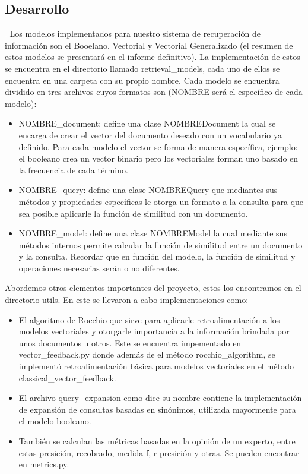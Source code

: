 \documentclass[10pt]{amsart}
\begin{document}
\begin{titlepage}
		\section{Desarrollo} \textcolor{white}{.}
		Los modelos implementados para nuestro sistema de recuperación de información son el Booelano, Vectorial y Vectorial Generalizado (el resumen de estos modelos se presentará en el informe definitivo). La implementación de estos se encuentra en el directorio llamado retrieval_models, cada uno de ellos se encuentra en una carpeta con su propio nombre. Cada modelo se encuentra dividido en tres archivos cuyos formatos son (NOMBRE será el específico de cada modelo):
		\begin{itemize}
		      \item NOMBRE_document: define una clase NOMBREDocument la cual se encarga de crear el vector del documento deseado con un vocabulario ya definido. Para cada modelo el vector se forma de manera específica, ejemplo: el booleano crea un vector binario pero los vectoriales forman uno basado en la frecuencia de cada término. 
		      \item NOMBRE_query: define una clase NOMBREQuery que mediantes sus métodos y propiedades específicas le otorga un formato a la consulta para que sea posible aplicarle la función de similitud con un documento.  
		      \item NOMBRE_model: define una clase NOMBREModel la cual mediante sus métodos internos permite calcular la función de similitud entre un documento y la consulta. Recordar que en función del modelo, la función de similitud y operaciones necesarias serán o no diferentes.  
		\end{itemize}
		Abordemos otros elementos importantes del proyecto, estos los encontramos en el directorio utils. En este se llevaron a cabo implementaciones como: 
		\begin{itemize}
		\item El algoritmo de Rocchio que sirve para aplicarle retroalimentación a los modelos vectoriales y otorgarle importancia a la información brindada por unos documentos u otros. Este se encuentra impementado en vector_feedback.py donde además de el método rocchio_algorithm, se implementó retroalimentación básica para modelos vectoriales en el método classical_vector_feedback.
		\item El archivo query_expansion como dice su nombre contiene la implementación de expansión de consultas basadas en sinónimos, utilizada mayormente para el modelo booleano.
		\item También se calculan las métricas basadas en la opinión de un experto, entre estas presición, recobrado, medida-f, r-presición y otras. Se pueden encontrar en metrics.py.
		\end{itemize}
		
	\end{titlepage}
	
	
	
\end{document}
